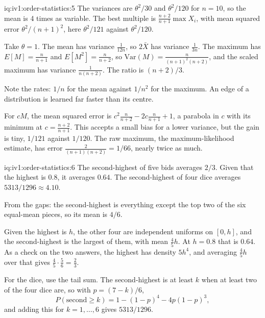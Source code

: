 \begin{solution}{iq:iv1:order-statistics:5}
The variances are $\theta^2/30$ and $\theta^2/120$ for $n = 10$, so the mean is 4 times as variable. The best multiple is $\frac{n + 2}{n + 1}\max X_i$, with mean squared error $\theta^2/(n + 1)^2$, here $\theta^2/121$ against $\theta^2/120$.

Take $\theta = 1$. The mean has variance $\frac{1}{12n}$, so $2\bar{X}$ has variance $\frac{1}{3n}$. The maximum has $E[M] = \frac{n}{n + 1}$ and $E[M^2] = \frac{n}{n + 2}$, so $\mathrm{Var}(M) = \frac{n}{(n + 1)^2(n + 2)}$, and the scaled maximum has variance $\frac{1}{n(n + 2)}$. The ratio is $(n + 2)/3$.

Note the rates: $1/n$ for the mean against $1/n^2$ for the maximum. An edge of a distribution is learned far faster than its centre.

For $cM$, the mean squared error is $c^2 \frac{n}{n + 2} - 2c \frac{n}{n + 1} + 1$, a parabola in $c$ with its minimum at $c = \frac{n + 2}{n + 1}$. This accepts a small bias for a lower variance, but the gain is tiny, $1/121$ against $1/120$. The raw maximum, the maximum-likelihood estimate, has error $\frac{2}{(n + 1)(n + 2)} = 1/66$, nearly twice as much.

\end{solution}

\begin{solution}{iq:iv1:order-statistics:6}
The second-highest of five bids averages $2/3$. Given that the highest is $0.8$, it averages $0.64$. The second-highest of four dice averages $5313/1296 \approx 4.10$.

From the gaps: the second-highest is everything except the top two of the six equal-mean pieces, so its mean is $4/6$.

Given the highest is $h$, the other four are independent uniforms on $[0, h]$, and the second-highest is the largest of them, with mean $\tfrac45 h$. At $h = 0.8$ that is $0.64$. As a check on the two answers, the highest has density $5h^4$, and averaging $\tfrac45 h$ over that gives $\tfrac45 \cdot \tfrac56 = \tfrac23$.

For the dice, use the tail sum. The second-highest is at least $k$ when at least two of the four dice are, so with $p = (7 - k)/6$,
\[
P(\text{second} \ge k) = 1 - (1 - p)^4 - 4p(1 - p)^3,
\]
and adding this for $k = 1, \dots, 6$ gives $5313/1296$.

\end{solution}

